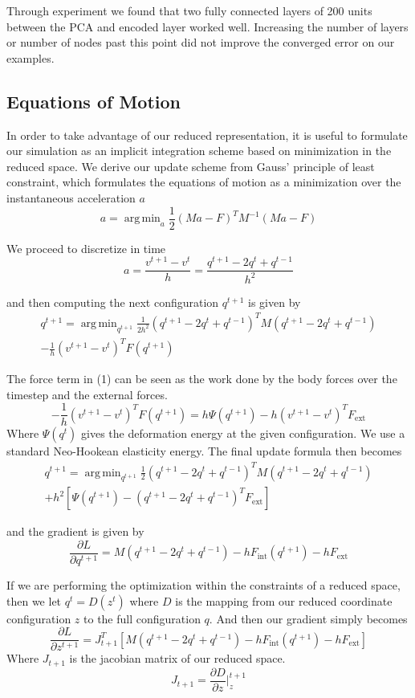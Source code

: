 \documentclass[sigconf, authorversion, review]{acmart}
\DeclareMathOperator*{\argmin}{arg\,min}
\begin{document}
Through experiment we found that two fully connected layers of 200 units between the PCA and encoded layer worked well. Increasing the number of layers or number of nodes past this point did not improve the converged error on our examples.




\subsection{Equations of Motion}
In order to take advantage of our reduced representation, it is useful to formulate our simulation as an implicit integration scheme based on minimization in the reduced space. We derive our update scheme from Gauss' principle of least constraint, which formulates the equations of motion as a minimization over the instantaneous acceleration $a$
$$a=\argmin_a{\frac{1}{2}(Ma-F)^TM^{-1}(Ma-F)}$$

We proceed to discretize in time
$$a=\frac{v^{t+1}-v^t}{h}=\frac{q^{t+1}-2q^{t}+q^{t-1}}{h^2}$$

and then computing the next configuration $q^{t+1}$ is given by
\begin{multline}
q^{t+1}=\argmin_{q^{t+1}}\frac{1}{2h^2}(q^{t+1}-2q^{t}+q^{t-1})^TM(q^{t+1}-2q^{t}+q^{t-1})\\-\frac{1}{h}(v^{t+1}-v^t)^TF(q^{t+1})
\end{multline}

The force term in (1) can be seen as the work done by the body forces over the timestep and the external forces.
$$-\frac{1}{h}(v^{t+1}-v^t)^TF(q^{t+1})=h\Psi(q^{t+1})-h(v^{t+1}-v^t)^TF_{\mathrm{ext}}$$
Where $\Psi(q^t)$ gives the deformation energy at the given configuration. We use a standard Neo-Hookean elasticity energy.
The final update formula then becomes
\begin{multline}
q^{t+1}=\argmin_{q^{t+1}}\frac{1}{2}(q^{t+1}-2q^{t}+q^{t-1})^TM(q^{t+1}-2q^{t}+q^{t-1})\\+h^2[\Psi(q^{t+1})-(q^{t+1}-2q^{t}+q^{t-1})^TF_{\mathrm{ext}}]
\end{multline}

and the gradient is given by
$$\frac{\partial L}{\partial q^{t+1}} = M(q^{t+1}-2q^{t}+q^{t-1}) - hF_{\mathrm{int}}(q^{t+1})-hF_{\mathrm{ext}}$$

If we are performing the optimization within the constraints of a reduced space, then we let $q^t=D(z^t)$ where $D$ is the mapping from our reduced coordinate configuration $z$ to the full configuration $q$. And then our gradient simply becomes
$$\frac{\partial L}{\partial z^{t+1}} = J_{t+1}^T[M(q^{t+1}-2q^{t}+q^{t-1}) - hF_{\mathrm{int}}(q^{t+1})-hF_{\mathrm{ext}}]$$
Where $J_{t+1}$ is the jacobian matrix of our reduced space.
$$J_{t+1} = \frac{\partial D}{\partial z}|_z^{t+1}$$
\end{document}
